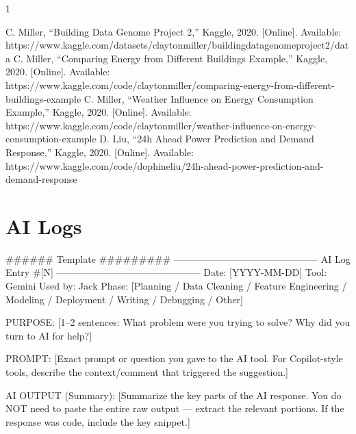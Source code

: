 \documentclass[conference]{IEEEtran}
\begin{document}

%
%
%
\begin{thebibliography}{1}

 C. Miller, ``Building Data Genome Project 2,'' Kaggle, 2020. [Online]. Available: https://www.kaggle.com/datasets/claytonmiller/buildingdatagenomeproject2/data
 C. Miller, ``Comparing Energy from Different Buildings Example,'' Kaggle, 2020. [Online]. Available: https://www.kaggle.com/code/claytonmiller/comparing-energy-from-different-buildings-example 
 C. Miller, ``Weather Influence on Energy Consumption Example,'' Kaggle, 2020. [Online]. Available: https://www.kaggle.com/code/claytonmiller/weather-influence-on-energy-consumption-example 
 D. Liu, ``24h Ahead Power Prediction and Demand Response,'' Kaggle, 2020. [Online]. Available: https://www.kaggle.com/code/dophineliu/24h-ahead-power-prediction-and-demand-response

\end{thebibliography}

\section{AI Logs}
###### Template #########
---------------------------------------------
AI Log Entry #[N]
---------------------------------------------
Date: [YYYY-MM-DD]
Tool: Gemini
Used by: Jack
Phase: [Planning / Data Cleaning / Feature Engineering /
    Modeling / Deployment / Writing / Debugging / Other]

PURPOSE:
[1–2 sentences: What problem were you trying to solve?
    Why did you turn to AI for help?]

PROMPT:
[Exact prompt or question you gave to the AI tool.
    For Copilot-style tools, describe the context/comment
    that triggered the suggestion.]

AI OUTPUT (Summary):
[Summarize the key parts of the AI response. You do NOT
    need to paste the entire raw output — extract the relevant
    portions. If the response was code, include the key snippet.]
\end{document}
